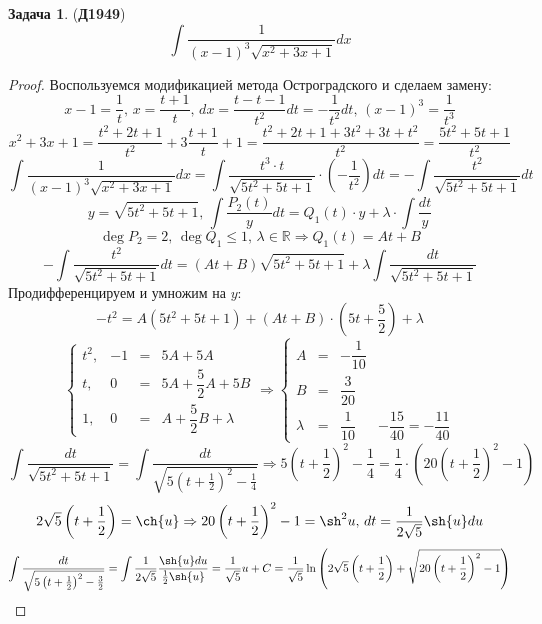 \documentclass[12pt]{article}
\newcommand{\MR}{\mathbb{R}}
\theoremstyle{definition}
\newtheorem{problem}{Задача}
\DeclareMathOperator{\dint}{\displaystyle\int}
\begin{document}
\newpage
\begin{problem}(\textbf{Д1949})
	$$
		\dint \dfrac{1}{(x-1)^3\sqrt{x^2 + 3x + 1}}dx
	$$
\end{problem}
\begin{proof}
	Воспользуемся модификацией метода Остроградского и сделаем замену:
	$$
		x - 1 = \dfrac{1}{t}, \, x = \dfrac{t + 1}{t}, \, dx = \dfrac{t - t - 1}{t^2}dt = -\dfrac{1}{t^2}dt, \, (x-1)^3 = \dfrac{1}{t^3}
	$$
	$$
		x^2 + 3x + 1 = \dfrac{t^2 + 2t + 1}{t^2} + 3\dfrac{t+1}{t} + 1 = \dfrac{t^2 + 2t + 1 + 3t^2 + 3t + t^2}{t^2} = \dfrac{5t^2 + 5t + 1}{t^2}
	$$
	$$
		\dint \dfrac{1}{(x-1)^3\sqrt{x^2 + 3x + 1}}dx = \dint \dfrac{t^3{\cdot}t}{\sqrt{5t^2 + 5t + 1}}{\cdot}\left(-\dfrac{1}{t^2}\right)dt = -\dint \dfrac{t^2}{\sqrt{5t^2 + 5t + 1}}dt 	
	$$
	$$
		y = \sqrt{5t^2 + 5t + 1}, \, \dint \dfrac{P_2(t)}{y}dt = Q_{1}(t){\cdot}y + \lambda{\cdot}\dint\dfrac{dt}{y} 
	$$
	$$	
		\deg{P_2} = 2,\, \deg{Q_{1}} \leq 1, \, \lambda \in \MR \Rightarrow Q_1(t) = At +B
	$$
	$$
		-\dint \dfrac{t^2}{\sqrt{5t^2 + 5t + 1}}dt 	= (At + B)\sqrt{5t^2 + 5t + 1} + \lambda \dint\dfrac{dt}{\sqrt{5t^2 + 5t + 1}}
	$$
	Продифференцируем и умножим на $y$:
	$$
		-t^2 = A(5t^2 + 5t + 1) + (At + B){\cdot}\left(5t + \dfrac{5}{2}\right) + \lambda
	$$
	$$
		\left\{
		\begin{matrix}
			t^2, & -1 &=& 5A + 5A \\[10pt]
			t, & 0 & = & 5A + \dfrac{5}{2}A + 5B \\[10pt]
			1, & 0 & = & A+ \dfrac{5}{2}B + \lambda
		\end{matrix}
		\right. \Rightarrow
		\left\{
		\begin{matrix}
			A &=& -\dfrac{1}{10}&\\[10pt]
			B& = & \dfrac{3}{20} &\\[10pt]
			\lambda & = & \dfrac{1}{10} & - \dfrac{15}{40} = -\dfrac{11}{40}
		\end{matrix}
		\right.
	$$
	$$
		\dint\dfrac{dt}{\sqrt{5t^2 + 5t + 1}} = \dint \dfrac{dt}{\sqrt{5\left(t + \tfrac{1}{2}\right)^2 - \tfrac{1}{4}}} \Rightarrow 5\left(t + \dfrac{1}{2}\right)^2 - \dfrac{1}{4}= \dfrac{1}{4}{\cdot}\left(20\left(t + \dfrac{1}{2}\right)^2 - 1\right)
	$$
	$$
		2\sqrt{5}\left(t + \dfrac{1}{2}\right) = \ch{u} \Rightarrow 20\left(t + \dfrac{1}{2}\right)^2 - 1 = \sh^2{u}, \, dt  = \dfrac{1}{2\sqrt{5}}\sh{u}du
	$$
	$$
		\dint \dfrac{dt}{\sqrt{5\left(t + \tfrac{1}{2}\right)^2 - \tfrac{3}{2}}} = \dint \dfrac{1}{2\sqrt{5}}\dfrac{\sh{u}du}{\tfrac{1}{2}\sh{u}} = \dfrac{1}{\sqrt{5}}u + C = \dfrac{1}{\sqrt{5}}\ln{\left(2\sqrt{5}\left(t + \dfrac{1}{2}\right) + \sqrt{20\left(t + \dfrac{1}{2}\right)^2 - 1}\right)}
$$
\end{proof}
\end{document}
